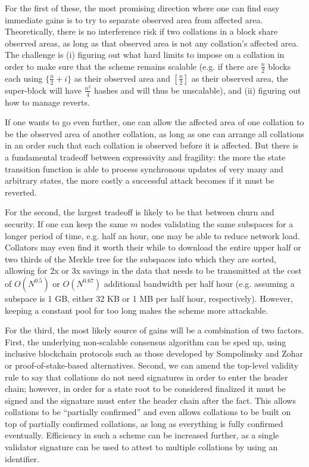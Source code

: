 \documentclass[11pt,a4paper]{article}
\makeatletter
\theoremstyle{plain}
\theoremstyle{definition}
\theoremstyle{remark}
\newcommand{\eg}{e.g.\@\xspace}
\makeatother
\begin{document}
For the first of these, the most promising direction where one can find easy immediate gains is to try to separate observed area from affected area. Theoretically, there is no interference risk if two collations in a block share observed areas, as long as that observed area is not any collation's affected area. The challenge is (i) figuring out what hard limits to impose on a collation in order to make sure that the scheme remains scalable (\eg if there are $\frac{n}{2}$ blocks each using $\{\frac{n}{2}+i\}$ as their observed area and $[\frac{n}{2}]$ as their observed area, the super-block will have $\frac{n^2}{4}$ hashes and will thus be unscalable), and (ii) figuring out how to manage reverts.

If one wants to go even further, one can allow the affected area of one collation to be the observed area of another collation, as long as one can arrange all collations in an order such that each collation is observed before it is affected. But there is a fundamental tradeoff between expressivity and fragility: the more the state transition function is able to process synchronous updates of very many and arbitrary states, the more costly a successful attack becomes if it must be reverted.

For the second, the largest tradeoff is likely to be that between churn and security. If one can keep the same $m$ nodes validating the same subspaces for a longer period of time, \eg half an hour, one may be able to reduce network load. Collators may even find it worth their while to download the entire upper half or two thirds of the Merkle tree for the subspaces into which they are sorted, allowing for 2x or 3x savings in the data that needs to be transmitted at the cost of $O(N^{0.5})$ or $O(N^{0.67})$ additional bandwidth per half hour (\eg assuming a subspace is 1 GB, either 32 KB or 1 MB per half hour, respectively). However, keeping a constant pool for too long makes the scheme more attackable.

For the third, the most likely source of gains will be a combination of two factors. First, the underlying non-scalable consensus algorithm can be sped up, using inclusive blockchain protocols such as those developed by Sompolinsky and Zohar\cite{inclusive} or proof-of-stake-based alternatives. Second, we can amend the top-level validity rule to say that collations do not need signatures in order to enter the header chain; however, in order for a state root to be considered finalized it must be signed and the signature must enter the header chain after the fact. This allows collations to be ``partially confirmed'' and even allows collations to be built on top of partially confirmed collations, as long as everything is fully confirmed eventually. Efficiency in such a scheme can be increased further, as a single validator signature can be used to attest to multiple collations by using an identifier.
\end{document}
